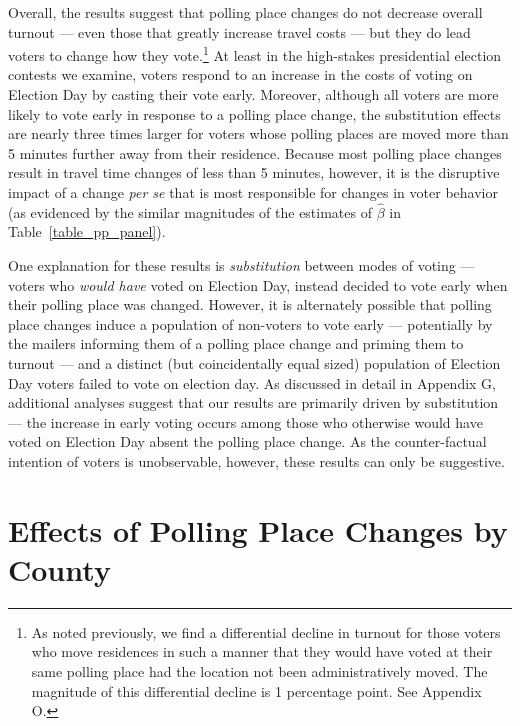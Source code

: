 \documentclass{cup_PSRM}
\begin{document}
Overall, the results suggest that polling place changes do not decrease overall turnout --- even those that greatly increase travel costs --- but they do lead voters to change how they vote.\footnote{As noted previously, we find a differential decline in turnout for those voters who move residences in such a manner that they would have voted at their same polling place had the location not been administratively moved.  The magnitude of this differential decline is 1 percentage point.  See Appendix O. }  At least in the high-stakes presidential election contests we examine, voters respond to an increase in the costs of voting on Election Day by casting their vote early. Moreover, although all voters are more likely to vote early in response to a polling place change, the substitution effects are nearly three times larger for voters whose polling places are moved more than 5 minutes further away from their residence. Because most polling place changes result in travel time changes of less than 5 minutes, however, it is the disruptive impact of a change \emph{per se} that is most responsible for changes in voter behavior (as evidenced by the similar magnitudes of the estimates of $\hat{\beta}$ in Table~\ref{table_pp_panel}).

One explanation for these results is \emph{substitution} between modes of voting --- voters who \emph{would have} voted on Election Day, instead decided to vote early when their polling place was changed.  However, it is alternately possible that polling place changes induce a population of non-voters to vote early --- potentially by the mailers informing them of a polling place change and priming them to turnout --- and a distinct (but coincidentally equal sized) population of Election Day voters failed to vote on election day. As discussed in detail in Appendix G, additional analyses suggest that our results are primarily driven by substitution --- the increase in early voting occurs among those who otherwise would have voted on Election Day absent the polling place change. As the counter-factual intention of voters is unobservable, however, these results can only be suggestive.





\section{Effects of Polling Place Changes by County}\label{section_countylevel}
\end{document}
